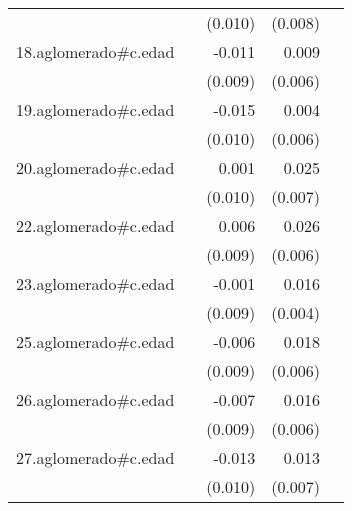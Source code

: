 {\begin{longtable}{l*{4}{D{.}{.}{-1}}}
            &                     &     (0.010)         &     (0.008)         &                     \\
\addlinespace
18.aglomerado#c.edad&                     &      -0.011         &       0.009         &                     \\
            &                     &     (0.009)         &     (0.006)         &                     \\
\addlinespace
19.aglomerado#c.edad&                     &      -0.015         &       0.004         &                     \\
            &                     &     (0.010)         &     (0.006)         &                     \\
\addlinespace
20.aglomerado#c.edad&                     &       0.001         &       0.025\sym{***}&                     \\
            &                     &     (0.010)         &     (0.007)         &                     \\
\addlinespace
22.aglomerado#c.edad&                     &       0.006         &       0.026\sym{***}&                     \\
            &                     &     (0.009)         &     (0.006)         &                     \\
\addlinespace
23.aglomerado#c.edad&                     &      -0.001         &       0.016\sym{***}&                     \\
            &                     &     (0.009)         &     (0.004)         &                     \\
\addlinespace
25.aglomerado#c.edad&                     &      -0.006         &       0.018\sym{**} &                     \\
            &                     &     (0.009)         &     (0.006)         &                     \\
\addlinespace
26.aglomerado#c.edad&                     &      -0.007         &       0.016\sym{*}  &                     \\
            &                     &     (0.009)         &     (0.006)         &                     \\
\addlinespace
27.aglomerado#c.edad&                     &      -0.013         &       0.013         &                     \\
            &                     &     (0.010)         &     (0.007)         &                     \\

\end{longtable}}
